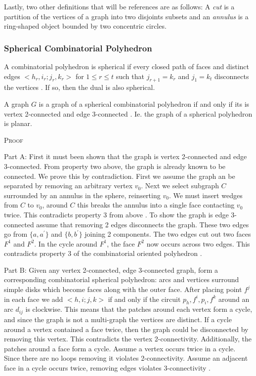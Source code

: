 \documentclass[11pt]{article}
\begin{document}
Lastly, two other definitions that will be references are as follows:
A \emph{cut} is a partition of the vertices of a graph into two disjoints subsets and an \emph{annulus} is a ring-shaped object bounded by two concentric circles. 

\subsubsection{Spherical Combinatorial Polyhedron}
A combinatorial polyhedron is spherical if every closed path of faces and distinct edges $<h_r,i_r;j_r,k_r>$ for $1 \leq r \leq t$ such that $j_{r+1} = k_r$ and $j_1 = k_t$ disconnects the vertices \cite{mccProof}. If so, then the dual is also spherical. 

A graph $G$ is a graph of a spherical combinatorial polyhedron if and only if its is vertex 2-connected and edge 3-connected \cite{mccProof}. Ie. the graph of a spherical polyhedron is planar.

\textsc{Proof}

Part A: First it must been shown that the graph is vertex 2-connected and edge 3-connected. From property two above, the graph is already known to be connected. We prove this by contradiction. First we assume the graph an be separated by removing an arbitrary vertex $v_0$. Next we select subgraph $C$ surrounded by an annulus in the sphere, reinserting $v_0$. We must insert wedges from $C$ to $v_0$, around $C$ this breaks the annulus into a single face contacting $v_0$ twice. This contradicts property 3 from above \cite{mccProof}.
To show the graph is edge 3-connected assume that removing 2 edges disconnects the graph. These two edges go from $\{a,a^{'}\}$ and $\{b, b^{'}\}$ joining 2 components. The two edges cut out two faces $F^1$ and $F^2$. In the cycle around $F^1$, the face $F^2$ now occurs across two edges. This contradicts property 3 of the combinatorial oriented polyhedron \cite{mccProof}.

Part B:
Given any vertex 2-connected, edge 3-connected graph, form a corresponding combinatorial spherical polyhedron: arcs and vertices surround simple disks which become faces along with the outer face. After placing point $f^j$ in each face we add $<h,i;j,k>$ if and only if the circuit $p_h, f^i,p_i,f^k$ around an arc $d_{ij}$ is clockwise. This means that the patches around each vertex form a cycle, and since the graph is not a multi-graph the vertices are distinct. If a cycle around a vertex contained a face twice, then the graph could be disconnected by removing this vertex. This contradicts the vertex 2-connectivity. Additionally, the patches around a face form a cycle. Assume a vertex occurs twice in a cycle. Since there are no loops removing it violates 2-connectivity. Assume an adjacent face in a cycle occurs twice, removing edges violates 3-connectivity \cite{mccProof}.
\end{document}
